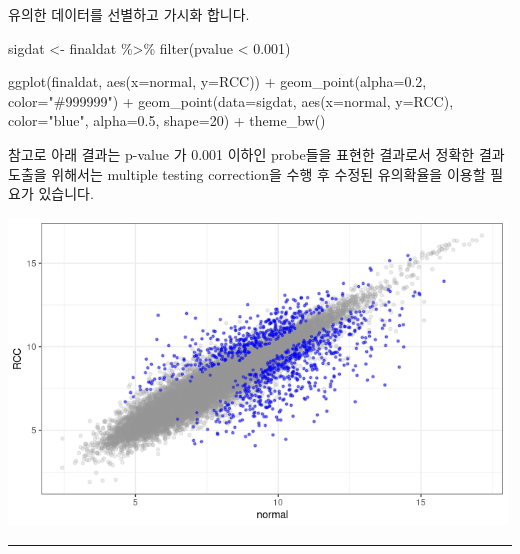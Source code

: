 \documentclass[
]{book}
\newenvironment{Shaded}{\begin{snugshade}}{\end{snugshade}}
\newcommand{\AttributeTok}[1]{\textcolor[rgb]{0.77,0.63,0.00}{#1}}
\newcommand{\DecValTok}[1]{\textcolor[rgb]{0.00,0.00,0.81}{#1}}
\newcommand{\FloatTok}[1]{\textcolor[rgb]{0.00,0.00,0.81}{#1}}
\newcommand{\FunctionTok}[1]{\textcolor[rgb]{0.00,0.00,0.00}{#1}}
\newcommand{\NormalTok}[1]{#1}
\newcommand{\OtherTok}[1]{\textcolor[rgb]{0.56,0.35,0.01}{#1}}
\newcommand{\SpecialCharTok}[1]{\textcolor[rgb]{0.00,0.00,0.00}{#1}}
\newcommand{\StringTok}[1]{\textcolor[rgb]{0.31,0.60,0.02}{#1}}
\begin{document}
유의한 데이터를 선별하고 가시화 합니다.

\begin{Shaded}
\begin{Highlighting}[]

\NormalTok{sigdat }\OtherTok{\textless{}{-}}\NormalTok{ finaldat }\SpecialCharTok{\%\textgreater{}\%} 
  \FunctionTok{filter}\NormalTok{(pvalue }\SpecialCharTok{\textless{}} \FloatTok{0.001}\NormalTok{)}

\FunctionTok{ggplot}\NormalTok{(finaldat, }\FunctionTok{aes}\NormalTok{(}\AttributeTok{x=}\NormalTok{normal, }\AttributeTok{y=}\NormalTok{RCC)) }\SpecialCharTok{+}
  \FunctionTok{geom\_point}\NormalTok{(}\AttributeTok{alpha=}\FloatTok{0.2}\NormalTok{, }\AttributeTok{color=}\StringTok{"\#999999"}\NormalTok{) }\SpecialCharTok{+}
  \FunctionTok{geom\_point}\NormalTok{(}\AttributeTok{data=}\NormalTok{sigdat, }\FunctionTok{aes}\NormalTok{(}\AttributeTok{x=}\NormalTok{normal, }\AttributeTok{y=}\NormalTok{RCC), }\AttributeTok{color=}\StringTok{"blue"}\NormalTok{, }\AttributeTok{alpha=}\FloatTok{0.5}\NormalTok{, }\AttributeTok{shape=}\DecValTok{20}\NormalTok{) }\SpecialCharTok{+}
  \FunctionTok{theme\_bw}\NormalTok{()}
\end{Highlighting}
\end{Shaded}

참고로 아래 결과는 p-value 가 0.001 이하인 probe들을 표현한 결과로서 정확한 결과 도출을 위해서는 multiple testing correction을 수행 후 수정된 유의확율을 이용할 필요가 있습니다.

\includegraphics[width=5.20833in,height=\textheight]{images/12/000024.png}

\begin{center}\rule{0.5\linewidth}{0.5pt}\end{center}
\end{document}
